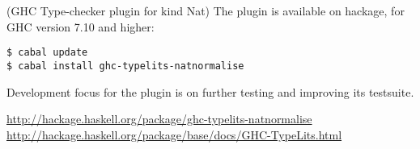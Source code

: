\documentclass[DIV16,twocolumn,10pt]{scrreprt}
\begin{document}
\begin{hcarentry}{(GHC Type-checker plugin for kind Nat)}
The plugin is available on hackage, for GHC version 7.10 and higher:
\begin{verbatim}
$ cabal update
$ cabal install ghc-typelits-natnormalise
\end{verbatim}

Development focus for the plugin is on further testing and improving its testsuite.

\FurtherReading
  \url{http://hackage.haskell.org/package/ghc-typelits-natnormalise} \\
  \url{http://hackage.haskell.org/package/base/docs/GHC-TypeLits.html}
\end{hcarentry}
\end{document}
